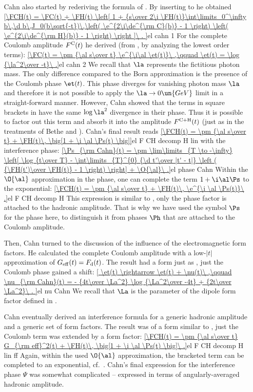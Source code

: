 Cahn  also started by rederiving the formula of \WY. By inserting  to  he obtained
\eqref{\FCH(t) = \FC(t)
+ \FH(t) \left[ 1 +
{s\over 2\i \FH(t)}\int\limits_0^\infty b\,\d b\,J_0(b\sqrt{-t})\,\left( \e^{2\i\de^{\rm C}(b)} - 1 \right) \left( \e^{2\i\de^{\rm H}(b)} - 1 \right)
\right ]\ .
}{el cahn 1}
For the complete Coulomb amplitude $F^{\rm C}(t)$ he derived (from , by analyzing the lowest order terms):
\eqref{\FC(t) = \pm {\al s\over t} \e^{\i\al \et(t)}\ ,\qquad \et(t) = \log {\la^2\over -t}\ .}{el cahn 2}
We recall that $\la$ represents the fictitious photon mass. The only difference compared to the Born approximation  is the presence of the Coulomb phase $\et(t)$. This phase diverges for vanishing photon mass $\la$ and therefore it is not possible to apply the $\la\to 0\un{GeV}$ limit in a straight-forward manner. However, Cahn showed that the terms in square brackets in  have the same $\log\la^2$ divergence in their phase. Thus it is possible to factor out this term and absorb it into the amplitude $F^{\rm C+H}(t)$ (just as in the treatments of Bethe and \WY). Cahn's final result reads
\eqref{\FCH(t) = \pm {\al s\over t} + \FH(t)\, \big[1 + \i \al \Ps(t) \big]}{el F CH decomp H lin}
with the interference phase:
\eqref{\Ps_{\rm Cahn}(t) = \pm \lim\limits_{T \to -\infty} \left[ \log {t\over T} - \int\limits_{T}^{0} {\d t'\over |t' - t|} \left ( {\FH(t')\over \FH(t)} - 1 \right) \right] + \O{\al}\ .}{el phase Cahn}
Within the $\O{\al}$ approximation in the phase, one can complete the term $1+\i\al\Ps$ to the exponential:
\eqref{\FCH(t) = \pm {\al s\over t} + \FH(t)\, \e^{\i \al \Ps(t)}\ .}{el F CH decomp H}
This expression is similar to , only the phase factor is attached to the hadronic amplitude. That is why we have used the symbol $\Ps$ for the phase here, to distinguish it from phases $\Ph$ that are attached to the Coulomb amplitude.

Then, Cahn turned to the discussion of the influence of the electromagnetic form factors. He calculated the complete Coulomb amplitude with a low-$|t|$ approximation of $G_{\rm eff}(t) = F_{\rm d}(t)$. The result had a form just as , just the Coulomb phase gained a shift:
\eqref{
	\et(t) \rightarrow \et(t) + \nu(t)\ ,\qquad
	\nu_{\rm Cahn}(t) = - {4t\over \La^2} \log {\La^2\over -4t} + {2t\over \La^2}\ .
}{el nu Cahn}
We recall that $\La$ is the parameter of the dipole form factor defined in .

Cahn eventually derived an interference formula for a generic hadronic amplitude and a generic set of form factors. The result was of a form similar to , just the Coulomb term was extended by a form factor:
\eqref{\FCH(t) = \pm {\al s\over t} G_{\rm eff}^2(t) + \FH(t)\, \big[1 + \i \al \Ps(t) \big]\ .}{el F CH decomp H lin ff}
Again, within the used $\O{\al}$ approximation, the bracketed term can be completed to an exponential, cf.~. Cahn's final expression for the interference phase $\Psi$ was somewhat complicated -- expressed in terms of angularly-averaged hadronic amplitude.

